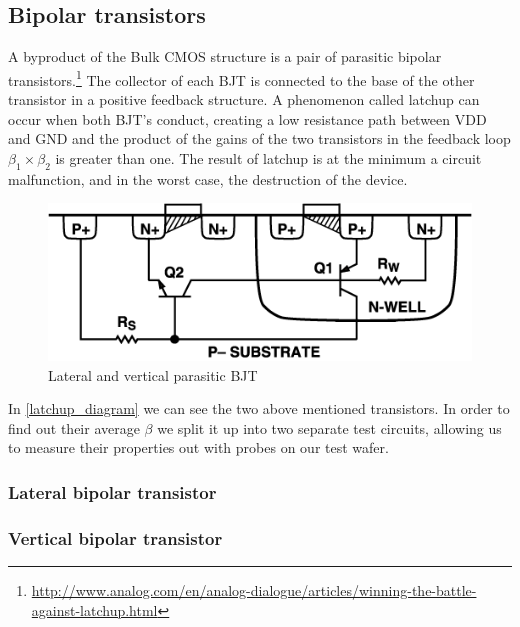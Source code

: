 \subsection{Bipolar transistors}
A byproduct of the Bulk CMOS structure is a pair of parasitic bipolar transistors.\footnote{\url{http://www.analog.com/en/analog-dialogue/articles/winning-the-battle-against-latchup.html}}
The collector of each BJT is connected to the base of the other transistor in a positive feedback structure.
A phenomenon called latchup can occur when both BJT's conduct, creating a low resistance path between VDD and GND and the product of the gains of the two transistors in the feedback loop $\beta_1 \times \beta_2$ is greater than one.
The result of latchup is at the minimum a circuit malfunction, and in the worst case, the destruction of the device.

\begin{figure}[H]
	\centering
	\includegraphics[scale=0.5]{latchup_cross.png}
	\caption{Lateral and vertical parasitic BJT}
	\label{latchup_diagram}
\end{figure}

In \autoref{latchup_diagram} we can see the two above mentioned transistors. In order to find out their average $\beta$ we split it up into two separate test circuits, allowing us to measure their properties out with probes on our test wafer.

\subsubsection{Lateral bipolar transistor}


\subsubsection{Vertical bipolar transistor}